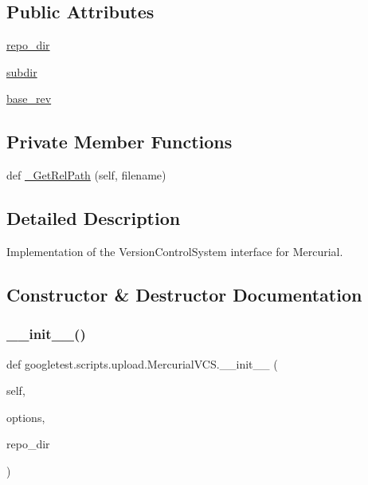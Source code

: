 \subsection*{Public Attributes}
\begin{DoxyCompactItemize}
\item 
\mbox{\hyperlink{classgoogletest_1_1scripts_1_1upload_1_1_mercurial_v_c_s_ac1412ab5eec8e991358292da2d595394}{repo\+\_\+dir}}
\item 
\mbox{\hyperlink{classgoogletest_1_1scripts_1_1upload_1_1_mercurial_v_c_s_aff063ef99e0fc3f8ef748d911afbe854}{subdir}}
\item 
\mbox{\hyperlink{classgoogletest_1_1scripts_1_1upload_1_1_mercurial_v_c_s_ad6c82fc68ae2d6f67221cefc1ed45ce8}{base\+\_\+rev}}
\end{DoxyCompactItemize}
\subsection*{Private Member Functions}
\begin{DoxyCompactItemize}
\item 
def \mbox{\hyperlink{classgoogletest_1_1scripts_1_1upload_1_1_mercurial_v_c_s_a1d3b5d9dd222bdf4a0b72969464bab25}{\+\_\+\+Get\+Rel\+Path}} (self, filename)
\end{DoxyCompactItemize}


\subsection{Detailed Description}
\begin{DoxyVerb}Implementation of the VersionControlSystem interface for Mercurial.\end{DoxyVerb}
 

\subsection{Constructor \& Destructor Documentation}
\mbox{\label{classgoogletest_1_1scripts_1_1upload_1_1_mercurial_v_c_s_a5c1ce2bfd3f74ad5a0b554ed15446b35}} 
\subsubsection{\texorpdfstring{\_\_init\_\_()}{\_\_init\_\_()}}
{\footnotesize\ttfamily def googletest.\+scripts.\+upload.\+Mercurial\+V\+C\+S.\+\_\+\+\_\+init\+\_\+\+\_\+ (\begin{DoxyParamCaption}\item[{}]{self,  }\item[{}]{options,  }\item[{}]{repo\+\_\+dir }\end{DoxyParamCaption})}



